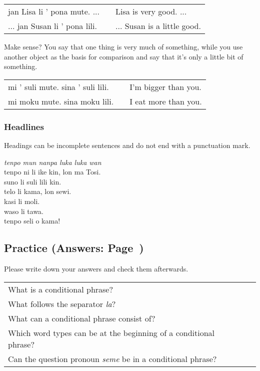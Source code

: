 \begin{supertabular}{p{5,5cm}|ll}
jan Lisa li ' pona mute. ...  && Lisa is very good. ... \\ %
... jan Susan li ' pona lili. && ... Susan is a little good. \\ %
\end{supertabular} 

Make sense? 
You say that one thing is very much of something, while you use another object as the basis for comparison and say that it's only a little bit of something. 

\begin{supertabular}{p{5,5cm}|ll}
mi ' suli mute. sina ' suli lili. && I'm bigger than you. \\
mi moku mute. sina moku lili. && I eat more than you. \\
\end{supertabular} 

%
\subsubsection*{Headlines} 
%
Headings can be incomplete sentences and do not end with a punctuation mark.

\textit{tenpo mun nanpa luka luka wan} \\
tenpo ni li ike kin, lon ma Tosi. \\
suno li suli lili kin. \\ 
telo li kama, lon sewi. \\
kasi li moli. \\
waso li tawa. \\
tenpo seli o kama! 

\newpage
\subsection*{Practice (Answers: Page~\pageref{'la'})}
%
Please write down your answers and check them afterwards. 

\begin{supertabular}{p{5,5cm}|ll}
What is a conditional phrase? &&  \\  %
What follows the separator \textit{la}? &&  \\  %
What can a conditional phrase consist of?  &&  \\  %
Which word types can be at the beginning of a conditional phrase? &&  \\  %
Can the question pronoun \textit{seme} be in a conditional phrase? &&   \\  %
\end{supertabular}

